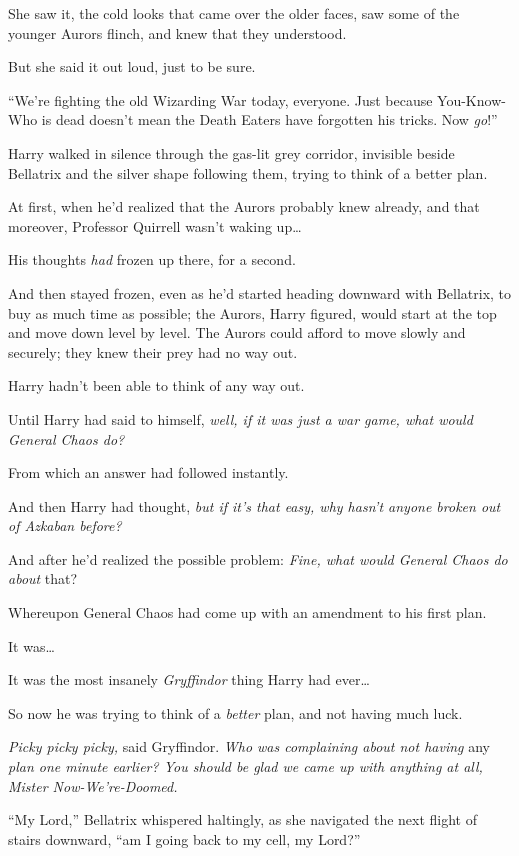 She saw it, the cold looks that came over the older faces, saw some of the younger Aurors flinch, and knew that they understood.

But she said it out loud, just to be sure.

“We’re fighting the old Wizarding War today, everyone. Just because You-Know-Who is dead doesn’t mean the Death Eaters have forgotten his tricks. Now \emph{go}!”

\later

Harry walked in silence through the gas-lit grey corridor, invisible beside Bellatrix and the silver shape following them, trying to think of a better plan.

At first, when he’d realized that the Aurors probably knew already, and that moreover, Professor Quirrell wasn’t waking up…

His thoughts \emph{had} frozen up there, for a second.

And then stayed frozen, even as he’d started heading downward with Bellatrix, to buy as much time as possible; the Aurors, Harry figured, would start at the top and move down level by level. The Aurors could afford to move slowly and securely; they knew their prey had no way out.

Harry hadn’t been able to think of any way out.

Until Harry had said to himself, \emph{well, if it was just a war game, what would General Chaos do?}

From which an answer had followed instantly.

And then Harry had thought, \emph{but if it’s \emph{that} easy, why hasn’t anyone broken out of Azkaban before?}

And after he’d realized the possible problem: \emph{Fine, what would General Chaos do about} that?

Whereupon General Chaos had come up with an amendment to his first plan.

It was…

It was the most insanely \emph{Gryffindor} thing Harry had ever…

So now he was trying to think of a \emph{better} plan, and not having much luck.

\emph{Picky picky picky,} said Gryffindor. \emph{Who was complaining about not having} any \emph{plan one minute earlier? You should be glad we came up with anything at all, Mister Now-We’re-Doomed.}

“My Lord,” Bellatrix whispered haltingly, as she navigated the next flight of stairs downward, “am I going back to my cell, my Lord?”

